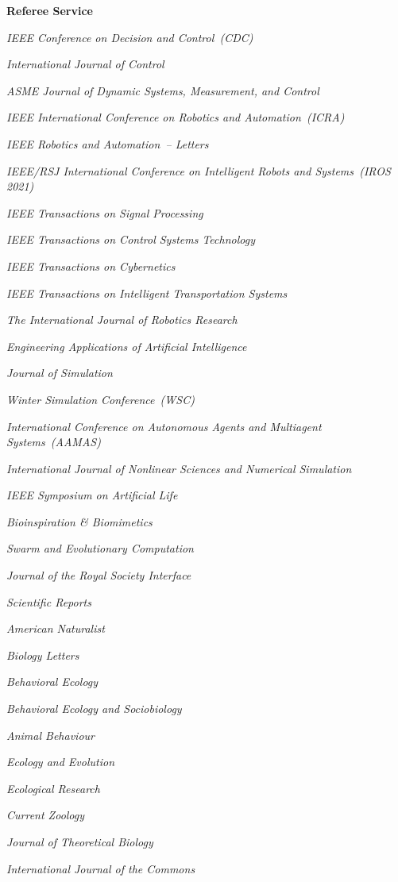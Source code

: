 \documentclass[10pt]{article}           %
\newcommand{\halfblankline}{\quad\vspace{-0.5\baselineskip}\pagebreak[3]}
\begin{document}
\halfblankline

\textbf{Referee Service}
\begin{innerlist}
    \item \emph{IEEE Conference on Decision and Control~(CDC)}
    \item \emph{International Journal of Control}
    \item \emph{ASME Journal of Dynamic Systems, Measurement, and Control}
    \item \emph{IEEE International Conference on Robotics and Automation~(ICRA)}
    \item \emph{IEEE Robotics and Automation~-- Letters}
    \item \emph{IEEE/RSJ International Conference on Intelligent Robots and Systems~(IROS 2021)}
    \item \emph{IEEE Transactions on Signal Processing}
    \item \emph{IEEE Transactions on Control Systems Technology}
    \item \emph{IEEE Transactions on Cybernetics}
    \item \emph{IEEE Transactions on Intelligent Transportation Systems}
    \item \emph{The International Journal of Robotics Research}
    \item \emph{Engineering Applications of Artificial Intelligence}
    \item \emph{Journal of Simulation}
    \item \emph{Winter Simulation Conference~(WSC)}
    \item \emph{International Conference on Autonomous Agents and Multiagent Systems~(AAMAS)}
    \item \emph{International Journal of Nonlinear Sciences and Numerical Simulation}
    \item \emph{IEEE Symposium on Artificial Life}
    \item \emph{Bioinspiration \& Biomimetics}
    \item \emph{Swarm and Evolutionary Computation}
    \item \emph{Journal of the Royal Society Interface}
    \item \emph{Scientific Reports}
    \item \emph{American Naturalist}
    \item \emph{Biology Letters}
    \item \emph{Behavioral Ecology}
    \item \emph{Behavioral Ecology and Sociobiology}
    \item \emph{Animal Behaviour}
    \item \emph{Ecology and Evolution}
    \item \emph{Ecological Research}
    \item \emph{Current Zoology}
    \item \emph{Journal of Theoretical Biology}
    \item \emph{International Journal of the Commons}
\end{innerlist}
\end{document}
